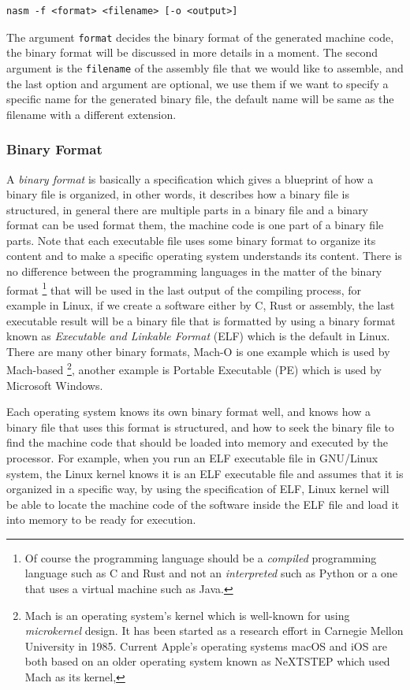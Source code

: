 \begin{lstlisting}
nasm -f <format> <filename> [-o <output>]
\end{lstlisting}

The argument \lstinline!format! decides the binary format of the
generated machine code, the binary format will be discussed in more
details in a moment. The second argument is the \lstinline!filename! of
the assembly file that we would like to assemble, and the last option
and argument are optional, we use them if we want to specify a specific
name for the generated binary file, the default name will be same as the
filename with a different extension.

\subsubsection{Binary Format}\label{binary-format}

A \emph{binary format} is basically a specification which gives a
blueprint of how a binary file is organized, in other words, it
describes how a binary file is structured, in general there are multiple
parts in a binary file and a binary format can be used format them, the
machine code is one part of a binary file parts. Note that each
executable file uses some binary format to organize its content and to
make a specific operating system understands its content. There is no
difference between the programming languages in the matter of the binary
format \footnote{Of course the programming language should be a
  \emph{compiled} programming language such as C and Rust and not an
  \emph{interpreted} such as Python or a one that uses a virtual machine
  such as Java.} that will be used in the last output of the compiling
process, for example in Linux, if we create a software either by C, Rust
or assembly, the last executable result will be a binary file that is
formatted by using a binary format known as \emph{Executable and
Linkable Format} (ELF) which is the default in Linux. There are many
other binary formats, Mach-O is one example which is used by Mach-based
\footnote{Mach is an operating system's kernel which is well-known for
  using \emph{microkernel} design. It has been started as a research
  effort in Carnegie Mellon University in 1985. Current Apple's
  operating systems macOS and iOS are both based on an older operating
  system known as NeXTSTEP which used Mach as its kernel,}, another
example is Portable Executable (PE) which is used by Microsoft Windows.

Each operating system knows its own binary format well, and knows how a
binary file that uses this format is structured, and how to seek the
binary file to find the machine code that should be loaded into memory
and executed by the processor. For example, when you run an ELF
executable file in GNU/Linux system, the Linux kernel knows it is an ELF
executable file and assumes that it is organized in a specific way, by
using the specification of ELF, Linux kernel will be able to locate the
machine code of the software inside the ELF file and load it into memory
to be ready for execution.

